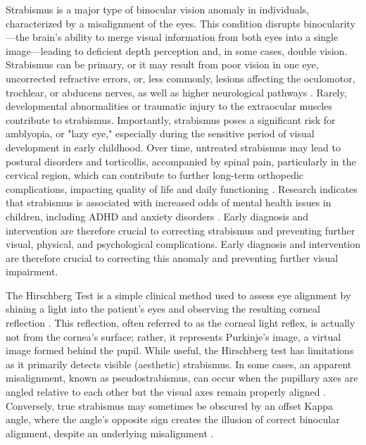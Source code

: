 \documentclass{article}
\begin{document}
Strabismus is a major type of binocular vision anomaly in individuals, characterized by a misalignment of the eyes. This condition disrupts binocularity—the brain’s ability to merge visual information from both eyes into a single image—leading to deficient depth perception and, in some cases, double vision. Strabismus can be primary, or it may result from poor vision in one eye, uncorrected refractive errors, or, less commonly, lesions affecting the oculomotor, trochlear, or abducens nerves, as well as higher neurological pathways \cite{Test for detecting Strabismus}. Rarely, developmental abnormalities or traumatic injury to the extraocular muscles contribute to strabismus. Importantly, strabismus poses a significant risk for amblyopia, or "lazy eye," especially during the sensitive period of visual development in early childhood.  Over time, untreated strabismus may lead to postural disorders and torticollis, accompanied by spinal pain, particularly in the cervical region, which can contribute to further long-term orthopedic complications, impacting quality of life and daily functioning \cite{strabismus children}. Research indicates that strabismus is associated with increased odds of mental health issues in children, including ADHD and anxiety disorders \cite{Pediatric}. Early diagnosis and intervention are therefore crucial to correcting strabismus and preventing further visual, physical, and psychological complications. Early diagnosis and intervention are therefore crucial to correcting this anomaly and preventing further visual impairment.

The Hirschberg Test is a simple clinical method used to assess eye alignment by shining a light into the patient's eyes and observing the resulting corneal reflection \cite{1}\cite{2}. This reflection, often referred to as the corneal light reflex, is actually not from the cornea's surface; rather, it represents Purkinje's image, a virtual image formed behind the pupil. While useful, the Hirschberg test has limitations as it primarily detects visible (aesthetic) strabismus. In some cases, an apparent misalignment, known as pseudostrabismus, can occur when the pupillary axes are angled relative to each other but the visual axes remain properly aligned \cite{1}. Conversely, true strabismus may sometimes be obscured by an offset Kappa angle, where the angle's opposite sign creates the illusion of correct binocular alignment, despite an underlying misalignment \cite{3}.
\end{document}
